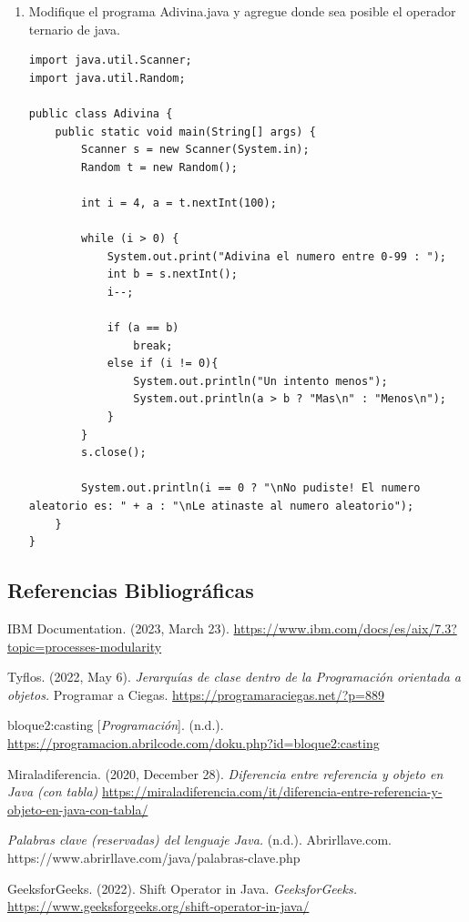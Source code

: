 \documentclass[12pt]{article}
\newcommand{\linejump}{\hfill \break}
\begin{document}
\begin{enumerate}[leftmargin=*]
        \item Modifique el programa Adivina.java y agregue donde sea posible el operador ternario de java.
        \begin{lstlisting}
import java.util.Scanner;
import java.util.Random;

public class Adivina {
    public static void main(String[] args) {
        Scanner s = new Scanner(System.in);
        Random t = new Random();

        int i = 4, a = t.nextInt(100);

        while (i > 0) {
            System.out.print("Adivina el numero entre 0-99 : ");
            int b = s.nextInt();
            i--;

            if (a == b)
                break;
            else if (i != 0){
                System.out.println("Un intento menos");
                System.out.println(a > b ? "Mas\n" : "Menos\n");
            }
        }
        s.close();

        System.out.println(i == 0 ? "\nNo pudiste! El numero aleatorio es: " + a : "\nLe atinaste al numero aleatorio");
    }
}   
        \end{lstlisting}
    \end{enumerate}

    \subsection*{Referencias Bibliográficas}
    IBM Documentation. (2023, March 23). \url{https://www.ibm.com/docs/es/aix/7.3?topic=processes-modularity}

    \linejump
    Tyflos. (2022, May 6). \textit{Jerarquías de clase dentro de la Programación orientada a objetos.} Programar a Ciegas. \url{https://programaraciegas.net/?p=889}

    \linejump
    bloque2:casting [\textit{Programación}]. (n.d.). \url{https://programacion.abrilcode.com/doku.php?id=bloque2:casting}

    \linejump
    Miraladiferencia. (2020, December 28). \textit{Diferencia entre referencia y objeto en Java (con tabla)} \url{https://miraladiferencia.com/it/diferencia-entre-referencia-y-objeto-en-java-con-tabla/}

    \linejump
    \textit{Palabras clave (reservadas) del lenguaje Java.} (n.d.). Abrirllave.com. https://www.abrirllave.com/java/palabras-clave.php

    \linejump
    GeeksforGeeks. (2022). Shift Operator in Java. \textit{GeeksforGeeks.} \url{https://www.geeksforgeeks.org/shift-operator-in-java/}
\end{document}

